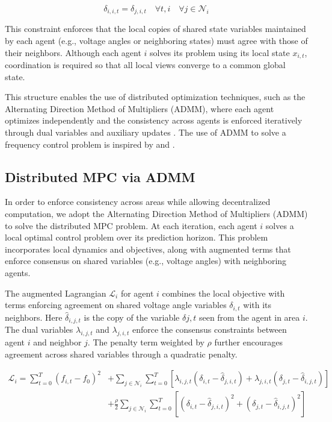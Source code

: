 \documentclass{article}
\begin{document}
\begin{equation}
    \delta_{i, i, t} = \delta_{j, i, t} \quad \forall t, i \quad \forall j \in \mathcal{N}_i
\end{equation}

This constraint enforces that the local copies of shared state variables maintained by each agent (e.g., voltage angles or neighboring states) must agree with those of their neighbors. Although each agent $i$ solves its problem using its local state $x_{i,t}$, coordination is required so that all local views converge to a common global state.

This structure enables the use of distributed optimization techniques, such as the Alternating Direction Method of Multipliers (ADMM), where each agent optimizes independently and the consistency across agents is enforced iteratively through dual variables and auxiliary updates \cite{ADMM:boyd}. The use of ADMM to solve a frequency control problem is inspired by \cite{paper:DMPC} and \cite{paper:marco}.

\subsection{Distributed MPC via ADMM}

In order to enforce consistency across areas while allowing decentralized computation, we adopt the Alternating Direction Method of Multipliers (ADMM) to solve the distributed MPC problem. At each iteration, each agent $i$ solves a local optimal control problem over its prediction horizon. This problem incorporates local dynamics and objectives, along with augmented terms that enforce consensus on shared variables (e.g., voltage angles) with neighboring agents.

The augmented Lagrangian $\mathcal{L}_i$ for agent $i$ combines the local objective with terms enforcing agreement on shared voltage angle variables $\delta_{i,t}$ with its neighbors. Here $\hat{\delta}_{i,j,t}$ is the copy of the variable $\delta{j,t}$ seen from the agent in area $i$. The dual variables $\lambda_{i,j,t}$ and $\lambda_{j,i,t}$ enforce the consensus constraints between agent $i$ and neighbor $j$. The penalty term weighted by $\rho$ further encourages agreement across shared variables through a quadratic penalty.
 
\begin{align}
    \mathcal{L}_i = \sum_{t=0}^{T} (f_{i,t} - f_0)^2 &+ \sum_{j \in \mathcal{N}_i} \sum_{t=0}^T \left[ \lambda_{i,j,t} (\delta_{i,t} - \hat{\delta}_{j,i,t}) + \lambda_{j,i,t} (\delta_{j,t} - \hat{\delta}_{i,j,t}) \right] \nonumber \\
    &+ \frac{\rho}{2} \sum_{j \in \mathcal{N}_i} \sum_{t=0}^T \left[ (\delta_{i,t} - \hat{\delta}_{j,i,t})^2 + (\delta_{j,t} - \hat{\delta}_{i,j,t})^2 \right]
\end{align}
\end{document}

